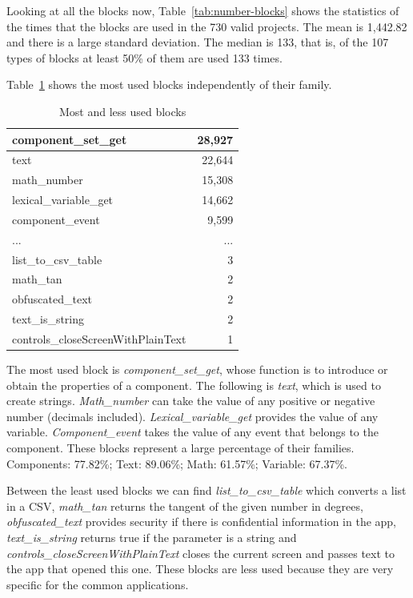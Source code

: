 \documentclass[a4paper]{article}
\begin{document}
Looking at all the blocks now, Table~\ref{tab:number-blocks} shows the statistics of the times that the blocks are used in the 730 valid projects. The mean is 1,442.82 and there is a large standard deviation. The median is 133, that is, of the 107 types of blocks at least 50\% of them are used 133 times.

Table~\ref{tab:most-least} shows the most used blocks independently of their family.

\begin{table}
\begin{center}
\caption{Most and less used blocks}
\bigskip
\label{tab:most-least}
\begin{tabular}{|l|r|}
\hline
component\_set\_get & 28,927\\ \hline
text & 22,644\\ \hline
math\_number & 15,308\\ \hline
lexical\_variable\_get & 14,662\\ \hline
component\_event & 9,599\\ \hline
... & ... \\ \hline
list\_to\_csv\_table & 3\\ \hline
math\_tan & 2\\ \hline
obfuscated\_text & 2\\ \hline
text\_is\_string & 2\\ \hline
controls\_closeScreenWithPlainText & 1\\ \hline
\end{tabular}
\end{center}
\end{table}

The most used block is \emph{component\_set\_get}, whose function is to introduce or obtain the properties of a component. The following is \emph{text}, which is used to create strings. \emph{Math\_number} can take the value of any positive or negative number (decimals included). \emph{Lexical\_variable\_get} provides the value of any variable. \emph{Component\_event} takes the value of any event that belongs to the component.
These blocks represent a large percentage of their families. Components: 77.82\%; Text: 89.06\%; Math: 61.57\%; Variable: 67.37\%.

Between the least used blocks we can find \emph{list\_to\_csv\_table} which converts a list in a CSV, \emph{math\_tan} returns the tangent of the given number in degrees, \emph{obfuscated\_text} provides security if there is confidential information in the app, \emph{text\_is\_string} returns true if the parameter is a string and \emph{controls\_closeScreenWithPlainText} closes the current screen and passes text to the app that opened this one. These blocks are less used because they are very specific for the common applications.
\end{document}
